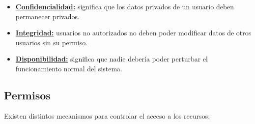 \begin{itemize}
\item \textbf{\underline{Confidencialidad:}} significa que los datos privados de un usuario deben permanecer privados.
\item \textbf{\underline{Integridad:}} usuarios no autorizados no deben poder modificar datos de otros usuarios sin su permiso.
\item \textbf{\underline{Disponibilidad:}} significa que nadie debería poder perturbar el funcionamiento normal del sistema.
\end{itemize}

\subsection{Permisos}

Existen distintos mecanismos para controlar el acceso a los recursos:

